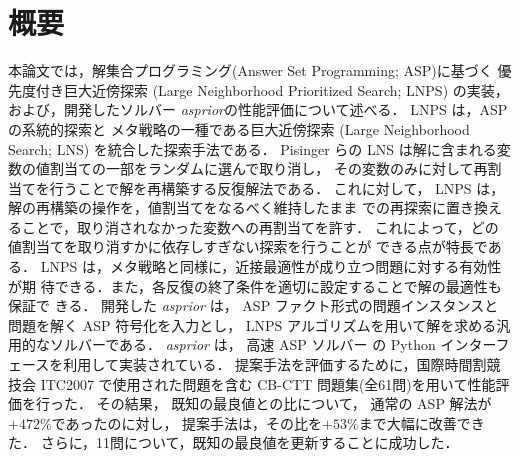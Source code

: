 \chapter*{概要}


本論文では，解集合プログラミング(Answer Set Programming; ASP)に基づく
優先度付き巨大近傍探索 (Large Neighborhood Prioritized Search; LNPS)
の実装，および，開発したソルバー \textit{asprior}の性能評価について述べる．
%
LNPS は，ASP の系統的探索と
メタ戦略の一種である巨大近傍探索
(Large Neighborhood Search; LNS)
を統合した探索手法である．
%
Pisinger らの LNS は解に含まれる変数の値割当ての一部をランダムに選んで取り消し，
その変数のみに対して再割当てを行うことで解を再構築する反復解法である．
これに対して，
LNPS は，解の再構築の操作を，値割当てをなるべく維持したまま
での再探索に置き換えることで，取り消されなかった変数への再割当てを許す．
これによって，どの値割当てを取り消すかに依存しすぎない探索を行うことが
できる点が特長である．
LNPS は，メタ戦略と同様に，近接最適性が成り立つ問題に対する有効性が期
待できる．また，各反復の終了条件を適切に設定することで解の最適性も保証で
きる．
開発した \textit{asprior} は，
ASP ファクト形式の問題インスタンスと
問題を解く ASP 符号化を入力とし，
LNPS アルゴリズムを用いて解を求める汎用的なソルバーである．
\textit{asprior} は，
高速 ASP ソルバー {\clingo}
の Python インターフェースを利用して実装されている．
%
提案手法を評価するために，国際時間割競技会 ITC2007
で使用された問題を含む CB-CTT 問題集(全61問)を用いて性能評価を行った．
その結果，
既知の最良値との比について，
通常の ASP 解法が$+472\%$であったのに対し，
提案手法は，その比を$+53\%$まで大幅に改善できた．
さらに，11問について，既知の最良値を更新することに成功した．

